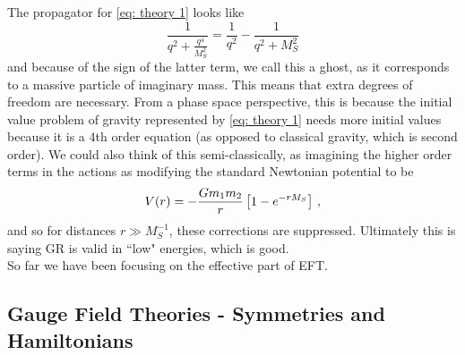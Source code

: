 \documentclass{article}
\begin{document}
The propagator for \ref{eq: theory 1} looks like 
\[
\frac{1}{q^2 + \frac{q^4}{M_S^2}} = \frac{1}{q^2} - \frac{1}{q^2 + M_S^2}
\]
and because of the sign of the latter term, we call this a ghost, as it corresponds to a massive particle of imaginary mass. This means that extra degrees of freedom are necessary. From a phase space perspective, this is because the initial value problem of gravity represented by \ref{eq: theory 1} needs more initial values because it is a 4th order equation (as opposed to classical gravity, which is second order). We could also think of this semi-classically, as imagining the higher order terms in the actions as modifying the standard Newtonian potential to be 
\[
V(r) = -\frac{Gm_1 m_2}{r} \left[ 1-e^{-rM_S} \right] \, ,
\]
and so for distances $r \gg M_S^{-1}$, these corrections are suppressed. Ultimately this is saying GR is valid in ``low" energies, which is good. \\
So far we have been focusing on the effective part of EFT. 

\subsection{Gauge Field Theories - Symmetries and Hamiltonians}
\end{document}
